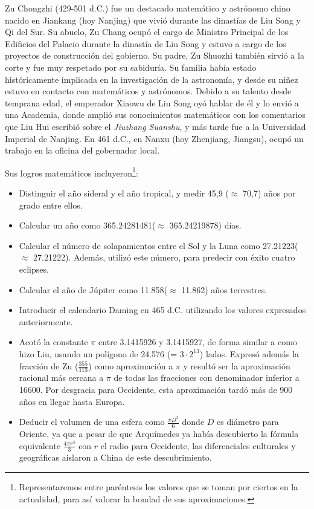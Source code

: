 \documentclass[a4paper, 11pt]{article}
\begin{document}
		Zu Chongzhi (429-501 d.C.) fue un destacado matemático y astrónomo chino nacido en Jiankang (hoy Nanjing) que
		vivió durante las dinastías de Liu Song y Qi del Sur. Su abuelo, Zu Chang ocupó el cargo de Ministro Principal
		de los Edificios del Palacio durante la dinastía de Liu Song y estuvo a cargo de los proyectos de construcción
		del gobierno. Su padre, Zu Shuozhi también sirvió a la corte y fue muy respetado por su sabiduría. Su familia
		había estado históricamente implicada en la investigación de la astronomía, y desde su niñez estuvo en contacto
		con matemáticos y astrónomos. Debido a su talento desde temprana edad, el emperador Xiaowu de Liu Song oyó hablar
		de él y lo envió a una Academia, donde amplió sus conocimientos matemáticos con los comentarios que Liu Hui
		escribió sobre el \textit{Jiuzhang Suanshu}, y más tarde fue a la Universidad Imperial de Nanjing. En 461 d.C.,
		en Nanxu (hoy Zhenjiang, Jiangsu), ocupó un trabajo en la oficina del gobernador local.
		
		Sus logros matemáticos incluyeron\footnote{Representaremos entre paréntesis los valores que se toman por ciertos
		en la actualidad, para así valorar la bondad de sus aproximaciones.}:
		\begin{itemize}
			\item Distinguir el año sideral y el año tropical, y medir 45,9 ($\approx$ 70,7) años por grado entre ellos.
			\item Calcular un año como 365.24281481($\approx$ 365.24219878) días.
			\item Calcular el número de solapamientos entre el Sol y la Luna como 27.21223($\approx$ 27.21222). Además,
			utilizó este número, para predecir con éxito cuatro eclipses.
			\item Calcular el año de Júpiter como 11.858($\approx$ 11.862) años terrestres.
			\item Introducir el calendario Daming en 465 d.C. utilizando los valores expresados anteriormente.
			\item Acotó la constante $\pi$ entre 3.1415926 y 3.1415927, de forma similar a como hizo Liu, usando un
			polígono de 24.576 (= $3 \cdot 2^13$) lados. Expresó además la fracción de Zu ($\frac{355}{113}$) como
			aproximación a $\pi$ y resultó ser la aproximación racional más cercana a $\pi$ de todas las fracciones con
			denominador inferior a 16600. Por desgracia para Occidente, esta aproximación tardó más de 900 años en llegar
			hasta Europa.
			\item Deducir el volumen de una esfera como $\frac{\pi D^3}{6}$ donde $D$ es diámetro para Oriente, ya que
			a pesar de que Arquímedes ya había descubierto la fórmula equivalente $\frac{4 \pi r^3}{3}$ con $r$ el radio
			para Occidente, las diferenciales culturales y geográficas aislaron a China de este descubrimiento.
		\end{itemize}
		
\end{document}
